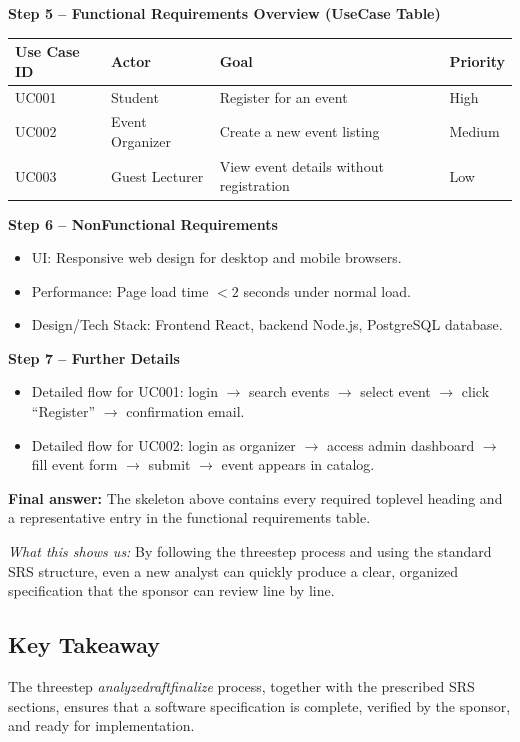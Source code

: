 \documentclass[12pt, a4paper]{article}
\begin{document}
\textbf{Step 5 -- Functional Requirements Overview (UseCase Table)}  

\begin{tabular}{|l|l|l|l|}
\hline
\textbf{Use Case ID} & \textbf{Actor} & \textbf{Goal} & \textbf{Priority} \\
\hline
UC001 & Student & Register for an event & High \\
\hline
UC002 & Event Organizer & Create a new event listing & Medium \\
\hline
UC003 & Guest Lecturer & View event details without registration & Low \\
\hline
\end{tabular}

\textbf{Step 6 -- NonFunctional Requirements}\\
\begin{itemize}
    \item UI: Responsive web design for desktop and mobile browsers.
    \item Performance: Page load time $< 2$ seconds under normal load.
    \item Design/Tech Stack: Frontend React, backend Node.js, PostgreSQL database.
\end{itemize}

\textbf{Step 7 -- Further Details}\\
\begin{itemize}
    \item Detailed flow for UC001: login $\rightarrow$ search events $\rightarrow$ select event $\rightarrow$ click ``Register'' $\rightarrow$ confirmation email.
    \item Detailed flow for UC002: login as organizer $\rightarrow$ access admin dashboard $\rightarrow$ fill event form $\rightarrow$ submit $\rightarrow$ event appears in catalog.
\end{itemize}

\textbf{Final answer:} The skeleton above contains every required toplevel heading and a representative entry in the functional requirements table.  

\textit{What this shows us:} By following the threestep process and using the standard SRS structure, even a new analyst can quickly produce a clear, organized specification that the sponsor can review line by line.  

\subsection{Key Takeaway}
The threestep \textit{analyzedraftfinalize} process, together with the prescribed SRS sections, ensures that a software specification is complete, verified by the sponsor, and ready for implementation.
\end{document}
